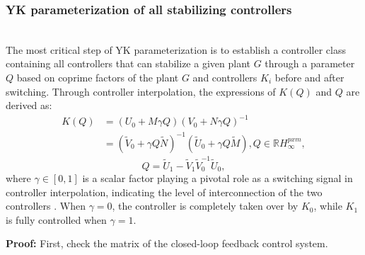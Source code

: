 \documentclass[journal]{IEEEtran}
\begin{document}
\subsubsection{YK parameterization of all stabilizing controllers}
\label{Section 3.2.3}
~\\

The most critical step of YK parameterization is to establish a controller class containing all controllers that can stabilize a given plant $G$ through a parameter $Q$ based on coprime factors of the plant $G$ and controllers $K_i$ before and after switching. Through controller interpolation, the expressions of $K(Q)$ and $Q$ are derived as:
\begin{equation}
  \begin{aligned}
    K(Q) & =  \left(U_{0}+M \gamma Q\right)\left(V_{0}+N \gamma Q\right)^{-1}                                                                     \\
         & =\left(\tilde{V}_{0}+\gamma Q \tilde{N}\right)^{-1}\left(\tilde{U}_{0}+\gamma Q \tilde{M}\right), Q \in \mathbb{R} H_{\infty}^{p x m},
  \end{aligned}
\end{equation}
\begin{equation}
  Q=\tilde{U}_{1}-\tilde{V}_{1} \tilde{V}_{0}^{-1} \tilde{U}_{0},
  \label{Eq20}
\end{equation}
where $\gamma \in [0,1]$ is a scalar factor playing a pivotal role as a switching signal in controller interpolation, indicating the level of interconnection of the two controllers \citep{niemann1999architecture}. When $\gamma=0$, the controller is completely taken over by $K_0$, while $K_1$ is fully controlled when $\gamma=1$.

\textbf{Proof:} First, check the matrix of the closed-loop feedback control system.
\end{document}
